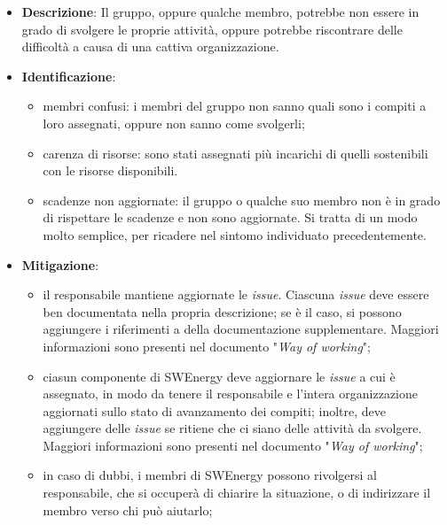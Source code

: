 \label{risk:organizzazione carente}
\begin{itemize}
	\item \textbf{Descrizione}:
	      Il gruppo, oppure qualche membro, potrebbe non essere in grado di
	      svolgere le proprie attività, oppure potrebbe riscontrare delle
	      difficoltà a causa di una cattiva organizzazione.
	\item \textbf{Identificazione}:
	      \begin{itemize}
		      \item membri confusi: i membri del gruppo non sanno quali sono i
		            compiti a loro assegnati, oppure non sanno come svolgerli;

		      \item carenza di risorse: sono stati assegnati più incarichi di
		            quelli sostenibili con le risorse disponibili.

		      \item scadenze non aggiornate: il gruppo o qualche suo membro non
		            è in grado di rispettare le scadenze e non sono aggiornate.
		            Si tratta di un modo molto semplice, per ricadere nel
		            sintomo individuato precedentemente.
	      \end{itemize}
	\item \textbf{Mitigazione}:
	      \begin{itemize}
		      \item il responsabile mantiene aggiornate le \textit{issue}.
		            Ciascuna \textit{issue} deve essere ben documentata nella
		            propria descrizione; se è il caso, si possono aggiungere i
		            riferimenti a della documentazione supplementare. Maggiori
		            informazioni sono presenti nel documento "\textit{Way of
			            working}";

		      \item ciasun componente di SWEnergy deve aggiornare le
		            \textit{issue} a cui è assegnato, in modo da tenere il
		            responsabile e l'intera organizzazione aggiornati sullo
		            stato di avanzamento dei compiti; inoltre, deve aggiungere
		            delle \textit{issue} se ritiene che ci siano delle attività
		            da svolgere. Maggiori informazioni sono presenti nel
		            documento "\textit{Way of working}";

		      \item in caso di dubbi, i membri di SWEnergy possono rivolgersi
		            al responsabile, che si occuperà di chiarire la situazione,
		            o di indirizzare il membro verso chi può aiutarlo;


\end{itemize}
\end{itemize}
